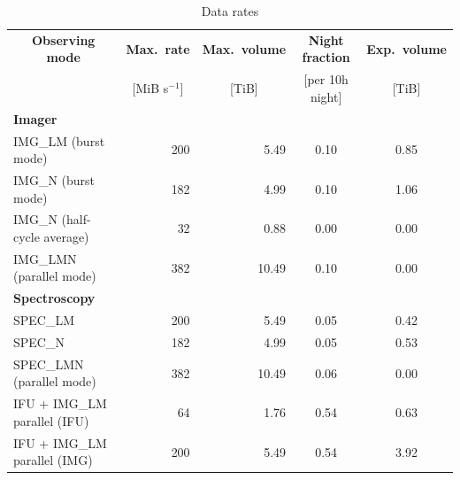 \begin{table}[ht]
  \centering
  \caption{Data rates}\label{tab:data_rates}
  \begin{tabular}{|l|r|r|c|c|}
    \hline
    \multicolumn{1}{|c|}{\textbf{Observing mode}} & \multicolumn{1}{c|}{\textbf{Max.\ rate}} & \multicolumn{1}{c|}{\textbf{Max.\ volume}} & \multicolumn{1}{c|}{\textbf{Night fraction}} & \multicolumn{1}{c|}{\textbf{Exp.\  volume}} \\
    \multicolumn{1}{|c|}{ }                       & \multicolumn{1}{c|}{[MiB s$^{-1}$]}     & \multicolumn{1}{c|}{[TiB]}                & \multicolumn{1}{c|}{[per 10h night]}         & \multicolumn{1}{c|}{[TiB]}                \\
    \hline\hline
    \textbf{Imager}                               &                                         &                                           &                                              &                                           \\
    IMG\_LM (burst mode)            & 200         & 5.49        & 0.10       & 0.85                                      \\
    IMG\_N (burst mode)             & 182         & 4.99        & 0.10       & 1.06                                      \\
    IMG\_N  (half-cycle average)    & 32          & 0.88        & 0.00       & 0.00                                      \\
    IMG\_LMN  (parallel mode)       & 382         & 10.49       & 0.10       & 0.00                                      \\
    \hline
    \textbf{Spectroscopy}          &                            &                      &                  &                                           \\
    SPEC\_LM                       & 200         & 5.49         & 0.05       & 0.42                       \\
    SPEC\_N                        & 182         & 4.99         & 0.05       & 0.53                       \\
    SPEC\_LMN  (parallel mode)     & 382         & 10.49        & 0.06       & 0.00                                      \\
    IFU + IMG\_LM parallel (IFU)   & 64          & 1.76         & 0.54       & 0.63                       \\
    IFU + IMG\_LM parallel (IMG)   & 200         & 5.49         & 0.54       & 3.92                                      \\
    \hline
  \end{tabular}
\end{table}


